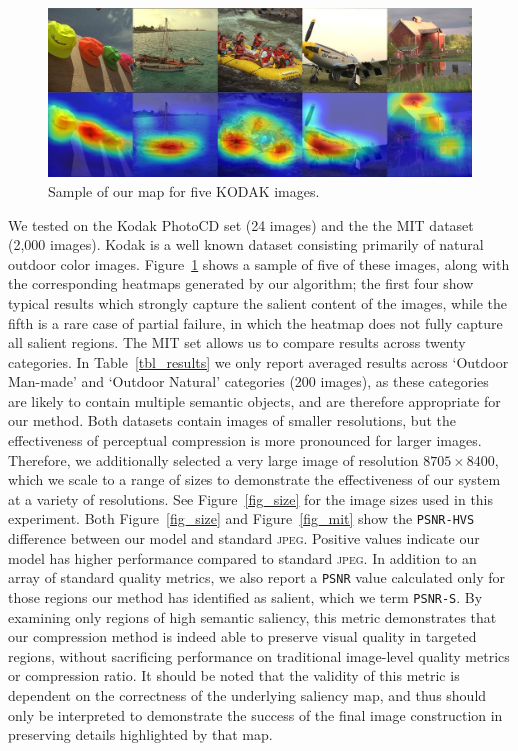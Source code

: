 \begin{figure}
    \centering
    \includegraphics[scale=0.37]{figures/semantic/all_images_small.png}
    \caption[Results on KODAK]{Sample of our map for five KODAK images.\label{fig_kodak_combo}}
\end{figure}

We tested on the Kodak PhotoCD set (24 images) and the the MIT dataset (2,000 images).
Kodak is a well known dataset consisting primarily of natural outdoor color images.
Figure~\ref{fig_kodak_combo} shows a sample of five of these images, along with the corresponding heatmaps generated by our algorithm; the first four show typical results which strongly capture the salient content of the images, while the fifth is a rare case of partial failure, in which the heatmap does not fully capture all salient regions.
The MIT set allows us to compare results across twenty categories. In Table~\ref{tbl_results} we only report averaged results across `Outdoor Man-made' and `Outdoor Natural' categories (200 images), as these categories are likely to contain multiple semantic objects, and are therefore appropriate for our method.
Both datasets contain images of smaller resolutions, but the effectiveness of perceptual compression is more pronounced for larger images.
Therefore, we additionally selected a very large image of resolution $8705\times8400$, which we scale to a range of sizes to demonstrate the effectiveness of our system at a variety of resolutions.
See Figure~\ref{fig_size} for the image sizes used in this experiment.
Both Figure~\ref{fig_size} and Figure~\ref{fig_mit} show the \texttt{PSNR-HVS} difference between our model and standard \textsc{jpeg}. Positive values indicate our model has higher performance compared to standard \textsc{jpeg}.
In addition to an array of standard quality metrics, we also report a \texttt{PSNR} value calculated only for those regions our method has identified as salient, which we term \texttt{PSNR-S}.
By examining only regions of high semantic saliency, this metric demonstrates that our compression method is indeed able to preserve visual quality in targeted regions, without sacrificing performance on traditional image-level quality metrics or compression ratio.
It should be noted that the validity of this metric is dependent on the correctness of the underlying saliency map, and thus should only be interpreted to demonstrate the success of the final image construction in preserving details highlighted by that map.

